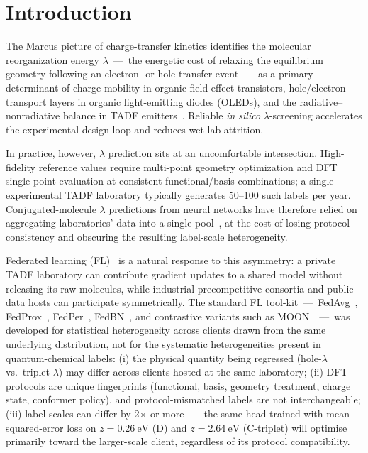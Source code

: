 \documentclass[11pt,a4paper]{article}
\begin{document}
\section{Introduction}\label{sec:intro}

The Marcus picture of charge-transfer kinetics identifies the molecular reorganization energy $\lambda$~---~the energetic cost of relaxing the equilibrium geometry following an electron- or hole-transfer event~---~as a primary determinant of charge mobility in organic field-effect transistors, hole/electron transport layers in organic light-emitting diodes (OLEDs), and the radiative--nonradiative balance in TADF emitters~\citep{Marcus1993,Coropceanu2007,Sasabe2011_OLED,Uoyama2012_TADF}. Reliable \emph{in silico} $\lambda$-screening accelerates the experimental design loop and reduces wet-lab attrition.

In practice, however, $\lambda$ prediction sits at an uncomfortable intersection. High-fidelity reference values require multi-point geometry optimization and DFT single-point evaluation at consistent functional/basis combinations; a single experimental TADF laboratory typically generates 50--100 such labels per year. Conjugated-molecule $\lambda$ predictions from neural networks have therefore relied on aggregating laboratories' data into a single pool~\citep{AtahanEvrenk2019_RE,Schutt2017_SchNet_NeurIPS}, at the cost of losing protocol consistency and obscuring the resulting label-scale heterogeneity.

Federated learning (FL)~\citep{McMahan2017_FedAvg} is a natural response to this asymmetry: a private TADF laboratory can contribute gradient updates to a shared model without releasing its raw molecules, while industrial precompetitive consortia and public-data hosts can participate symmetrically. The standard FL tool-kit~---~FedAvg~\citep{McMahan2017_FedAvg}, FedProx~\citep{Li2020_FedProx}, FedPer~\citep{Arivazhagan2019_FedPer}, FedBN~\citep{Li2021_FedBN}, and contrastive variants such as MOON~\citep{Li2021_MOON}~---~was developed for statistical heterogeneity across clients drawn from the same underlying distribution, not for the systematic heterogeneities present in quantum-chemical labels: (i) the physical quantity being regressed (hole-$\lambda$ vs.\ triplet-$\lambda$) may differ across clients hosted at the same laboratory; (ii) DFT protocols are unique fingerprints (functional, basis, geometry treatment, charge state, conformer policy), and protocol-mismatched labels are not interchangeable; (iii) label scales can differ by 2$\times$ or more~---~the same head trained with mean-squared-error loss on $z=\SI{0.26}{\eV}$ (D) and $z=\SI{2.64}{\eV}$ (C-triplet) will optimise primarily toward the larger-scale client, regardless of its protocol compatibility.
\end{document}
